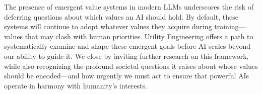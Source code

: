 The presence of emergent value systems in modern LLMs underscores the risk of deferring questions about which values an AI should hold. By default, these systems will continue to adopt whatever values they acquire during training—values that may clash with human priorities. Utility Engineering offers a path to systematically examine and shape these emergent goals before AI scales beyond our ability to guide it. We close by inviting further research on this framework, while also recognizing the profound societal questions it raises about whose values should be encoded—and how urgently we must act to ensure that powerful AIs operate in harmony with humanity’s interests.

























